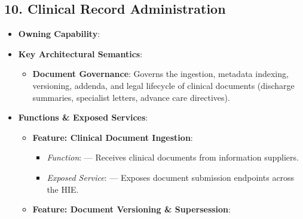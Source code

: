 \par\smallskip
{}\label{rad:sa:162}
\subsection*{10. Clinical Record Administration}
\label{rad:sa:163}

\begin{itemize}

\item 
\textbf{Owning Capability}: \texttt{}



\item 
\textbf{Key Architectural Semantics}:


\begin{itemize}

\item 
\textbf{Document Governance}: Governs the ingestion, metadata indexing, versioning, addenda, and legal lifecycle of clinical documents (discharge summaries, specialist letters, advance care directives).



\end{itemize}


\item 
\textbf{Functions \& Exposed Services}:


\begin{itemize}

\item 
\textbf{Feature: Clinical Document Ingestion}:


\begin{itemize}

\item 
\emph{Function}: \texttt{} — Receives clinical documents from information suppliers.



\item 
\emph{Exposed Service}: \texttt{} — Exposes document submission endpoints across the HIE.



\end{itemize}


\item 
\textbf{Feature: Document Versioning \& Supersession}:


\begin{itemize}


\end{itemize}
\end{itemize}
\end{itemize}
